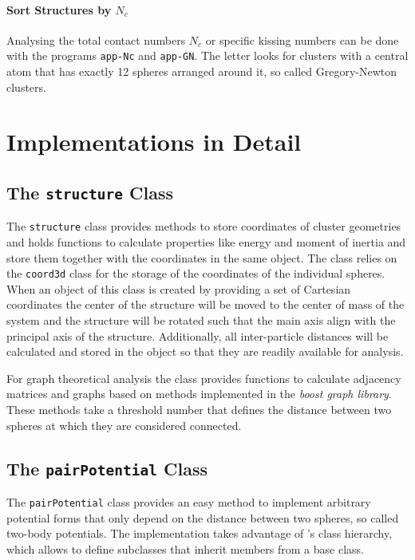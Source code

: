 \paragraph{Sort Structures by $N_c$}%

Analysing the total contact numbers $N_c$ or specific kissing numbers can be
done with the programs \texttt{app-Nc} and \texttt{app-GN}. The letter looks
for clusters with a central atom that has exactly 12 spheres arranged around
it, so called Gregory-Newton clusters.



\section{Implementations in Detail}
\label{sec:ImplementationsinDetail}

\subsection{The \texttt{structure} Class}
\label{sec:thestructureclass}

The \verb|structure| class provides methods to store coordinates of cluster
geometries and holds functions to calculate properties like energy and moment
of inertia and store them together with the coordinates in the same object. The
class relies on the \verb|coord3d| class for the storage of the coordinates of
the individual spheres.  When an object of this class is created by providing a
set of Cartesian coordinates the center of the structure will be moved to the
center of mass of the system and the structure will be rotated such that the
main axis align with the principal axis of the structure. Additionally, all
inter-particle distances will be calculated and stored in the object so that
they are readily available for analysis.

For graph theoretical analysis the class provides functions to calculate
adjacency matrices and graphs based on methods implemented in the \textit{boost
graph library}\autocite{_boost_2002}. These methods take a threshold number
that defines the distance between two spheres at which they are considered
connected.

\subsection{The \texttt{pairPotential} Class}
\label{sec:thepairpotentialclass}

The \texttt{pairPotential} class provides an easy method to implement arbitrary
potential forms that only depend on the distance between two spheres, so called
two-body potentials. The implementation takes advantage of \Cpp's class
hierarchy, which allows to define subclasses that inherit members from a base
class.


